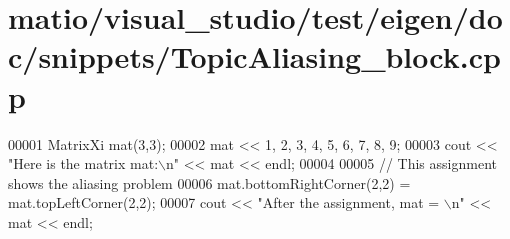 \hypertarget{matio_2visual__studio_2test_2eigen_2doc_2snippets_2_topic_aliasing__block_8cpp_source}{}\section{matio/visual\+\_\+studio/test/eigen/doc/snippets/\+Topic\+Aliasing\+\_\+block.cpp}
\label{matio_2visual__studio_2test_2eigen_2doc_2snippets_2_topic_aliasing__block_8cpp_source}

\begin{DoxyCode}
00001 MatrixXi mat(3,3); 
00002 mat << 1, 2, 3,   4, 5, 6,   7, 8, 9;
00003 cout << \textcolor{stringliteral}{"Here is the matrix mat:\(\backslash\)n"} << mat << endl;
00004 
00005 \textcolor{comment}{// This assignment shows the aliasing problem}
00006 mat.bottomRightCorner(2,2) = mat.topLeftCorner(2,2);
00007 cout << \textcolor{stringliteral}{"After the assignment, mat = \(\backslash\)n"} << mat << endl;
\end{DoxyCode}
